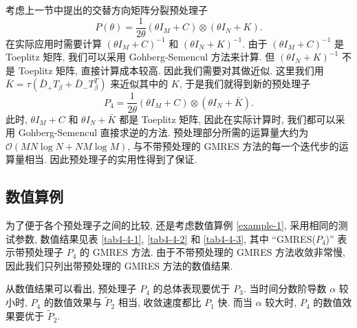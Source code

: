 \documentclass{ecnumaster}
\begin{document}
考虑上一节中提出的交替方向矩阵分裂预处理子 
$$ P(\theta) = \frac{1}{2 \theta} (\theta I_M + C) \otimes (\theta I_N + K). $$
在实际应用时需要计算 $(\theta I_M + C)^{-1}$ 和 $(\theta I_N + K)^{-1}$.
由于 $(\theta I_M + C)^{-1}$ 是 Toeplitz 矩阵, 我们可以采用 
Gohberg-Semencul 方法来计算.
但 $(\theta I_N + K)^{-1}$ 不是 Toeplitz 矩阵, 直接计算成本较高.
因此我们需要对其做近似.
这里我们用 $\bar{K} = \tau (\bar{D}_+ T_{\beta} + \bar{D}_- T_{\beta}^T)$ 
来近似其中的 $K$, 于是我们就得到新的预处理子
$$ P_4 = \frac{1}{2 \theta} (\theta I_M + C) \otimes (\theta I_N + \bar{K}). $$
此时, $\theta I_M + C$ 和 $\theta I_N + \bar{K}$ 都是 Toeplitz 矩阵,
因此在实际计算时, 我们都可以采用 Gohberg-Semencul 直接求逆的方法.
预处理部分所需的运算量大约为 $\mathcal{O}(MN\log N + NM\log M)$, 
与不带预处理的 GMRES 方法的每一个迭代步的运算量相当.
因此预处理子的实用性得到了保证.

\subsection{数值算例}
为了便于各个预处理子之间的比较,
还是考虑数值算例 \ref{example-1},
采用相同的测试参数, 数值结果见表 \ref{tab4-4-1}, \ref{tab4-4-2} 和 \ref{tab4-4-3},
其中 “GMRES($P_4$)” 表示带预处理子 $P_4$ 的 GMRES 方法.
由于不带预处理的 GMRES 方法收敛非常慢, 因此我们只列出带预处理的 GMRES 方法的数值结果.

从数值结果可以看出, 预处理子 $P_4$ 的总体表现要优于 $P_3$.
当时间分数阶导数 $\alpha$ 较小时, $P_4$ 的数值效果与 $\tilde{P}_2$ 相当,
收敛速度都比 $P_1$ 快.
而当 $\alpha$ 较大时, $P_4$ 的数值效果要优于 $\tilde{P}_2$.
\end{document}
